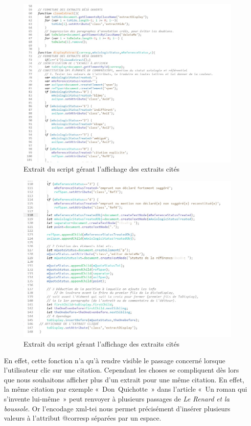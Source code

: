 \begin{figure}[H]
    \centering
    \includegraphics[scale =0.8]{img/screen_quote_js1.jpg}
    \caption{Extrait du script gérant l'affichage des extraits cités}
    \label{fig:displayExtract1}
\end{figure}
\begin{figure}[H]
    \centering
    \includegraphics[scale =0.82]{img/screen_quote_js2.jpg}
    \caption{Extrait du script gérant l'affichage des extraits cités}
    \label{fig:displayExtract2}
\end{figure}


En effet, cette fonction n'a qu'à rendre visible le passage concerné lorsque l'utilisateur clic sur une citation. Cependant les choses se compliquent dès lors que nous souhaitons afficher plus d'un extrait pour une même citation. En effet, la même citation par exemple «~Don~Quichotte~» dans l'article «~Un roman qui s'invente lui-même~» peut renvoyer à plusieurs passages de \textit{Le Renard et la boussole}. Or l'encodage xml-tei nous permet précisément d'insérer plusieurs valeurs à l'attribut @corresp séparées par un espace.

